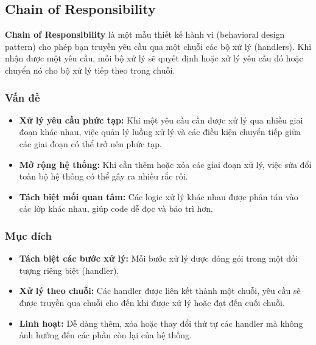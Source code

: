 \subsection{Chain of Responsibility}
\begin{flushleft}
	\textbf{Chain of Responsibility} là một mẫu thiết kế hành vi (behavioral design pattern) cho phép bạn truyền yêu cầu qua một chuỗi các bộ xử lý (handlers). Khi nhận được một yêu cầu, mỗi bộ xử lý sẽ quyết định hoặc xử lý yêu cầu đó hoặc chuyển nó cho bộ xử lý tiếp theo trong chuỗi.
\end{flushleft}

\subsubsection{Vấn đề}
\begin{flushleft}
	\begin{itemize}
		\item \textbf{Xử lý yêu cầu phức tạp:} Khi một yêu cầu cần được xử lý qua nhiều giai đoạn khác nhau, việc quản lý luồng xử lý và các điều kiện chuyển tiếp giữa các giai đoạn có thể trở nên phức tạp.
		\item \textbf{Mở rộng hệ thống:} Khi cần thêm hoặc xóa các giai đoạn xử lý, việc sửa đổi toàn bộ hệ thống có thể gây ra nhiều rắc rối.
		\item \textbf{Tách biệt mối quan tâm:} Các logic xử lý khác nhau được phân tán vào các lớp khác nhau, giúp code dễ đọc và bảo trì hơn.
	\end{itemize}
\end{flushleft}

\subsubsection{Mục đích}
\begin{flushleft}
	\begin{itemize}
		\item \textbf{Tách biệt các bước xử lý:} Mỗi bước xử lý được đóng gói trong một đối tượng riêng biệt (handler).
		\item \textbf{Xử lý theo chuỗi:} Các handler được liên kết thành một chuỗi, yêu cầu sẽ được truyền qua chuỗi cho đến khi được xử lý hoặc đạt đến cuối chuỗi.
		\item \textbf{Linh hoạt:} Dễ dàng thêm, xóa hoặc thay đổi thứ tự các handler mà không ảnh hưởng đến các phần còn lại của hệ thống.
	\end{itemize}
\end{flushleft}

